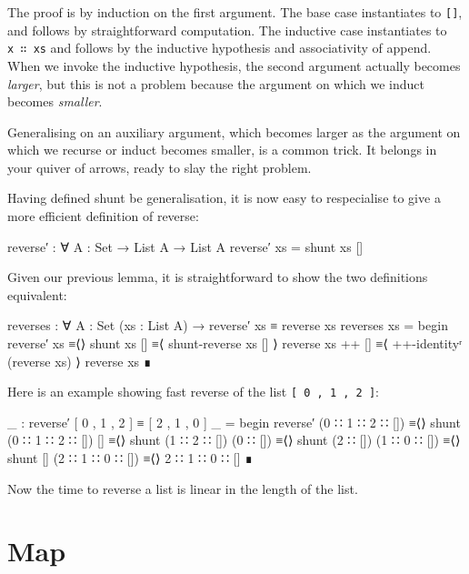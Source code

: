 The proof is by induction on the first argument. The base case
instantiates to \texttt{{[}{]}}, and follows by straightforward
computation. The inductive case instantiates to \texttt{x\ ∷\ xs} and
follows by the inductive hypothesis and associativity of append. When we
invoke the inductive hypothesis, the second argument actually becomes
\emph{larger}, but this is not a problem because the argument on which
we induct becomes \emph{smaller}.

Generalising on an auxiliary argument, which becomes larger as the
argument on which we recurse or induct becomes smaller, is a common
trick. It belongs in your quiver of arrows, ready to slay the right
problem.

Having defined shunt be generalisation, it is now easy to respecialise
to give a more efficient definition of reverse:

\begin{fence}
\begin{code}
reverse′ : ∀ {A : Set} → List A → List A
reverse′ xs = shunt xs []
\end{code}
\end{fence}

Given our previous lemma, it is straightforward to show the two
definitions equivalent:

\begin{fence}
\begin{code}
reverses : ∀ {A : Set} (xs : List A)
  → reverse′ xs ≡ reverse xs
reverses xs =
  begin
    reverse′ xs
  ≡⟨⟩
    shunt xs []
  ≡⟨ shunt-reverse xs [] ⟩
    reverse xs ++ []
  ≡⟨ ++-identityʳ (reverse xs) ⟩
    reverse xs
  ∎
\end{code}
\end{fence}

Here is an example showing fast reverse of the list
\texttt{{[}\ 0\ ,\ 1\ ,\ 2\ {]}}:

\begin{fence}
\begin{code}
_ : reverse′ [ 0 , 1 , 2 ] ≡ [ 2 , 1 , 0 ]
_ =
  begin
    reverse′ (0 ∷ 1 ∷ 2 ∷ [])
  ≡⟨⟩
    shunt (0 ∷ 1 ∷ 2 ∷ []) []
  ≡⟨⟩
    shunt (1 ∷ 2 ∷ []) (0 ∷ [])
  ≡⟨⟩
    shunt (2 ∷ []) (1 ∷ 0 ∷ [])
  ≡⟨⟩
    shunt [] (2 ∷ 1 ∷ 0 ∷ [])
  ≡⟨⟩
    2 ∷ 1 ∷ 0 ∷ []
  ∎
\end{code}
\end{fence}

Now the time to reverse a list is linear in the length of the list.

\hypertarget{Lists-Map}{%
\section{Map}\label{Lists-Map}}

